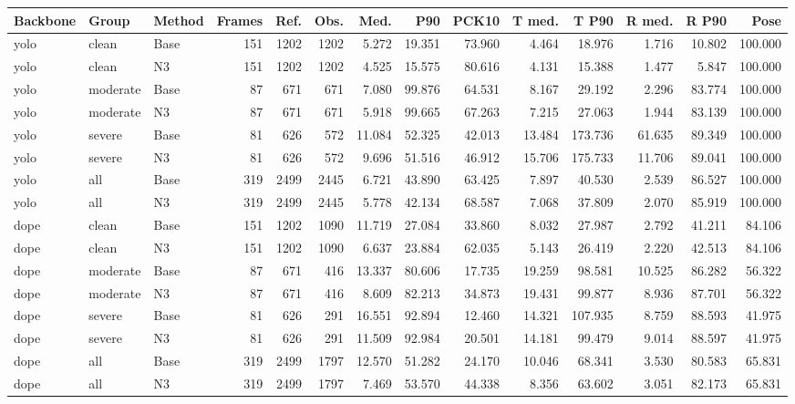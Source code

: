 \begin{tabular}{lllrrrrrrrrrrr}
\toprule
Backbone & Group & Method & Frames & Ref. & Obs. & Med. & P90 & PCK10 & T med. & T P90 & R med. & R P90 & Pose \\
\midrule
yolo & clean & Base & 151 & 1202 & 1202 & 5.272 & 19.351 & 73.960 & 4.464 & 18.976 & 1.716 & 10.802 & 100.000 \\
yolo & clean & N3 & 151 & 1202 & 1202 & 4.525 & 15.575 & 80.616 & 4.131 & 15.388 & 1.477 & 5.847 & 100.000 \\
yolo & moderate & Base & 87 & 671 & 671 & 7.080 & 99.876 & 64.531 & 8.167 & 29.192 & 2.296 & 83.774 & 100.000 \\
yolo & moderate & N3 & 87 & 671 & 671 & 5.918 & 99.665 & 67.263 & 7.215 & 27.063 & 1.944 & 83.139 & 100.000 \\
yolo & severe & Base & 81 & 626 & 572 & 11.084 & 52.325 & 42.013 & 13.484 & 173.736 & 61.635 & 89.349 & 100.000 \\
yolo & severe & N3 & 81 & 626 & 572 & 9.696 & 51.516 & 46.912 & 15.706 & 175.733 & 11.706 & 89.041 & 100.000 \\
yolo & all & Base & 319 & 2499 & 2445 & 6.721 & 43.890 & 63.425 & 7.897 & 40.530 & 2.539 & 86.527 & 100.000 \\
yolo & all & N3 & 319 & 2499 & 2445 & 5.778 & 42.134 & 68.587 & 7.068 & 37.809 & 2.070 & 85.919 & 100.000 \\
dope & clean & Base & 151 & 1202 & 1090 & 11.719 & 27.084 & 33.860 & 8.032 & 27.987 & 2.792 & 41.211 & 84.106 \\
dope & clean & N3 & 151 & 1202 & 1090 & 6.637 & 23.884 & 62.035 & 5.143 & 26.419 & 2.220 & 42.513 & 84.106 \\
dope & moderate & Base & 87 & 671 & 416 & 13.337 & 80.606 & 17.735 & 19.259 & 98.581 & 10.525 & 86.282 & 56.322 \\
dope & moderate & N3 & 87 & 671 & 416 & 8.609 & 82.213 & 34.873 & 19.431 & 99.877 & 8.936 & 87.701 & 56.322 \\
dope & severe & Base & 81 & 626 & 291 & 16.551 & 92.894 & 12.460 & 14.321 & 107.935 & 8.759 & 88.593 & 41.975 \\
dope & severe & N3 & 81 & 626 & 291 & 11.509 & 92.984 & 20.501 & 14.181 & 99.479 & 9.014 & 88.597 & 41.975 \\
dope & all & Base & 319 & 2499 & 1797 & 12.570 & 51.282 & 24.170 & 10.046 & 68.341 & 3.530 & 80.583 & 65.831 \\
dope & all & N3 & 319 & 2499 & 1797 & 7.469 & 53.570 & 44.338 & 8.356 & 63.602 & 3.051 & 82.173 & 65.831 \\

\end{tabular}
